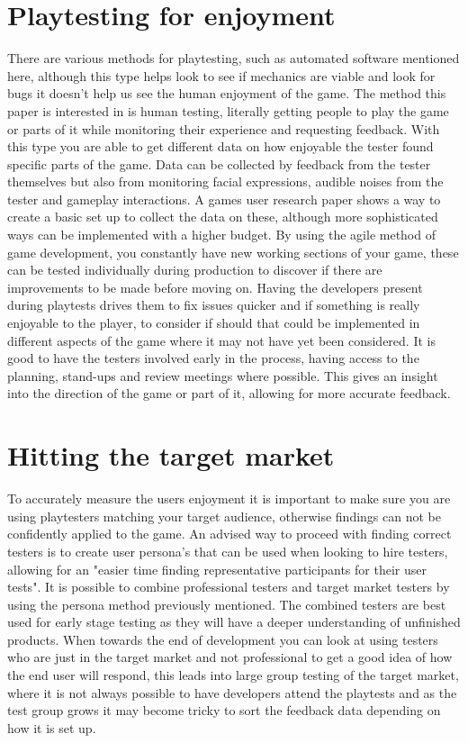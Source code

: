 \documentclass{scrartcl}
\begin{document}
	\section{Playtesting for enjoyment}
	There are various methods for playtesting, such as automated software mentioned  here\cite{powley2016semi}, although this type helps look to see if mechanics are viable and look for bugs it doesn't help us see the human enjoyment of the game. The method this paper is interested in is human testing, literally getting people to play the game or parts of it while monitoring their experience and requesting feedback. With this type you are able to get different data on how enjoyable the tester found specific parts of the game. Data can be collected by feedback from the tester themselves but also from monitoring facial expressions, audible noises from the tester and gameplay interactions. A games user research\cite{moosajee2016games} paper shows a way to create a basic set up to collect the data on these, although more sophisticated ways can be implemented with a higher budget. By using the agile method of game development, you constantly have new working sections of your game, these can be tested individually during production to discover if there are improvements to be made before moving on. Having the developers present during playtests drives them to fix issues quicker and if something is really enjoyable to the player, to consider if should that could be implemented in different aspects of the game where it may not have yet been considered\cite{moosajee2016games}. It is good to have the testers involved early in the process, having access to the planning, stand-ups and review meetings where possible\cite{cruzes2016communication}. This gives an insight into the direction of the game or part of it, allowing for more accurate feedback.
	
	\section{Hitting the target market}
	To accurately measure the users enjoyment it is important to make sure you are using playtesters matching your target audience, otherwise findings can not be confidently applied to the game\cite{moosajee2016games}. An advised way to proceed with finding correct testers is to create user persona's that can be used when looking to hire testers, allowing for an "easier time finding representative participants for their user tests"\cite{moosajee2016games}. It is possible to combine professional testers and target market testers by using the persona method previously mentioned. The combined testers are best used for early stage testing as they will have a deeper understanding of unfinished products\cite{ollila2008using}. When towards the end of development you can look at using testers who are just in the target market and not professional to get a good idea of how the end user will respond, this leads into large group testing of the target market, where it is not always possible to have developers attend the playtests and as the test group grows it may become tricky to sort the feedback data depending on how it is set up.
	
\end{document}

